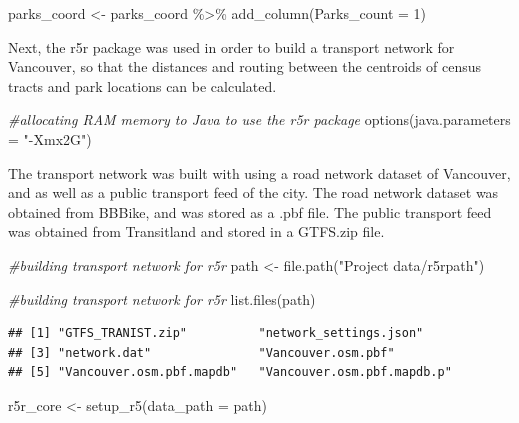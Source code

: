 \documentclass[
]{article}
\newenvironment{Shaded}{\begin{snugshade}}{\end{snugshade}}
\newcommand{\AttributeTok}[1]{\textcolor[rgb]{0.77,0.63,0.00}{#1}}
\newcommand{\CommentTok}[1]{\textcolor[rgb]{0.56,0.35,0.01}{\textit{#1}}}
\newcommand{\DecValTok}[1]{\textcolor[rgb]{0.00,0.00,0.81}{#1}}
\newcommand{\FunctionTok}[1]{\textcolor[rgb]{0.00,0.00,0.00}{#1}}
\newcommand{\NormalTok}[1]{#1}
\newcommand{\OtherTok}[1]{\textcolor[rgb]{0.56,0.35,0.01}{#1}}
\newcommand{\SpecialCharTok}[1]{\textcolor[rgb]{0.00,0.00,0.00}{#1}}
\newcommand{\StringTok}[1]{\textcolor[rgb]{0.31,0.60,0.02}{#1}}
\begin{document}
\begin{Shaded}
\begin{Highlighting}[]
\NormalTok{parks\_coord }\OtherTok{\textless{}{-}}\NormalTok{ parks\_coord }\SpecialCharTok{\%\textgreater{}\%}
  \FunctionTok{add\_column}\NormalTok{(}\AttributeTok{Parks\_count =} \DecValTok{1}\NormalTok{)}
\end{Highlighting}
\end{Shaded}

Next, the r5r package was used in order to build a transport network for
Vancouver, so that the distances and routing between the centroids of
census tracts and park locations can be calculated.

\begin{Shaded}
\begin{Highlighting}[]
\CommentTok{\#allocating RAM memory to Java to use the r5r package}
\FunctionTok{options}\NormalTok{(}\AttributeTok{java.parameters =} \StringTok{"{-}Xmx2G"}\NormalTok{)}
\end{Highlighting}
\end{Shaded}

The transport network was built with using a road network dataset of
Vancouver, and as well as a public transport feed of the city. The road
network dataset was obtained from BBBike, and was stored as a .pbf file.
The public transport feed was obtained from Transitland and stored in a
GTFS.zip file.

\begin{Shaded}
\begin{Highlighting}[]
\CommentTok{\#building transport network for r5r}
\NormalTok{path }\OtherTok{\textless{}{-}} \FunctionTok{file.path}\NormalTok{(}\StringTok{"Project data/r5rpath"}\NormalTok{)}

\CommentTok{\#building transport network for r5r}
\FunctionTok{list.files}\NormalTok{(path)}
\end{Highlighting}
\end{Shaded}

\begin{verbatim}
## [1] "GTFS_TRANIST.zip"          "network_settings.json"    
## [3] "network.dat"               "Vancouver.osm.pbf"        
## [5] "Vancouver.osm.pbf.mapdb"   "Vancouver.osm.pbf.mapdb.p"
\end{verbatim}

\begin{Shaded}
\begin{Highlighting}[]
\NormalTok{r5r\_core }\OtherTok{\textless{}{-}} \FunctionTok{setup\_r5}\NormalTok{(}\AttributeTok{data\_path =}\NormalTok{ path)}
\end{Highlighting}
\end{Shaded}
\end{document}
